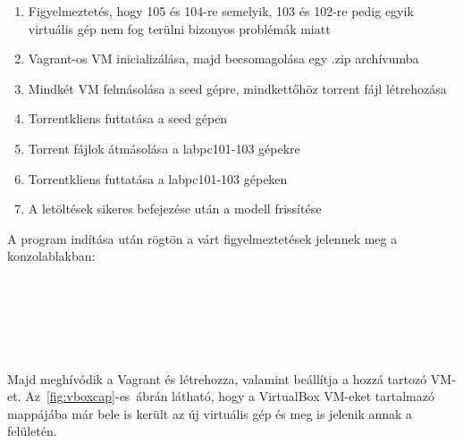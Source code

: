 \begin{enumerate}
  \item Figyelmeztetés, hogy 105 és 104-re semelyik, 103 és 102-re pedig egyik virtuális gép nem fog terülni bizonyos problémák miatt
  \item Vagrant-os VM inicializálása, majd becsomagolása egy .zip archívumba
  \item Mindkét VM felmásolása a seed gépre, mindkettőhöz torrent fájl létrehozása
  \item Torrentkliens futtatása a seed gépen
  \item Torrent fájlok átmásolása a labpc101-103 gépekre
  \item Torrentkliens futtatása a labpc101-103 gépeken
  \item A letöltések sikeres befejezése után a modell frissítése
\end{enumerate}

A program indítása után rögtön a várt figyelmeztetések jelennek meg a konzolablakban:\\\\
\\
\\
\\
\\\\
Majd meghívódik a Vagrant és létrehozza, valamint beállítja a hozzá tartozó VM-et. Az~\ref{fig:vboxcap}-es~ábrán látható, hogy a VirtualBox VM-eket tartalmazó mappájába már bele is került az új virtuális gép és meg is jelenik annak a felületén.

